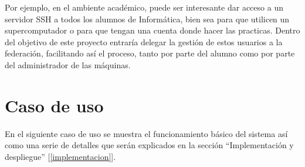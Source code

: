 Por ejemplo, en el ambiente académico, puede ser interesante dar
acceso a un servidor SSH a todos los alumnos de Informática, bien sea
para que utilicen un supercomputador o para que tengan una cuenta
donde hacer las practicas. Dentro del objetivo de este proyecto
entraría delegar la gestión de estos usuarios a la federación,
facilitando así el proceso, tanto por parte del alumno como por parte del
administrador de las máquinas.

\newpage
\section{Caso de uso}

    En el siguiente caso de uso se muestra el funcionamiento básico del
    sistema así como una serie de detalles que serán explicados
    en la sección ``Implementación y despliegue''
    [\ref{implementacion}].



